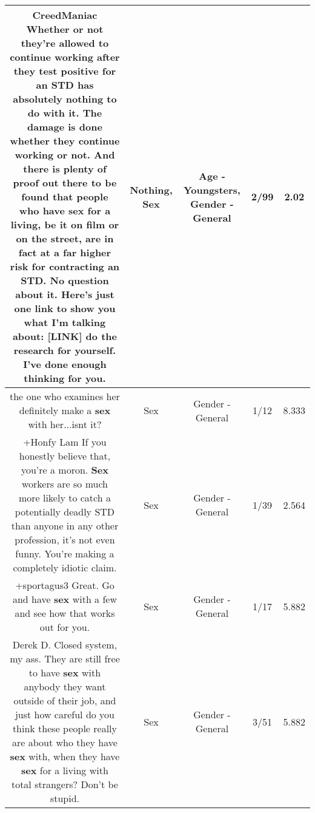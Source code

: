 \documentclass[11pt]{article}
\newlength\mylength
\begin{document}
\begin{center}
\begin{longtable}{|C{.65\mylength}|C{.30\mylength}|C{.12\mylength}|C{.12\mylength}|C{.12\mylength}|}
  \small CreedManiac Whether or not they're allowed to continue working after they test positive for an STD has absolutely \textbf{nothing} to do with it. The damage is done whether they continue working or not. And there is plenty of proof out there to be found that people who have \textbf{sex} for a living, be it on film or on the street, are in fact at a far higher risk for contracting an STD. No question about it. Here's just one link to show you what I'm talking about:  [LINK]  do the research for yourself. I've done enough thinking for you.\normalsize   & Nothing, Sex & Age - Youngsters, Gender - General & 2/99 & 2.02 \\  \hline
  \small the one who examines her definitely make a \textbf{sex} with her...isnt it?\normalsize   & Sex & Gender - General & 1/12 & 8.333 \\  \hline
  \small +Honfy Lam If you honestly believe that, you're a moron. \textbf{Sex} workers are so much more likely to catch a potentially deadly STD than anyone in any other profession, it's not even funny. You're making a completely idiotic claim.\normalsize   & Sex & Gender - General & 1/39 & 2.564 \\  \hline
  \small +sportagus3 Great. Go and have \textbf{sex} with a few and see how that works out for you.\normalsize   & Sex & Gender - General & 1/17 & 5.882 \\  \hline
  \small Derek D. Closed system, my ass. They are still free to have \textbf{sex} with anybody they want outside of their job, and just how careful do you think these people really are about who they have \textbf{sex} with, when they have \textbf{sex} for a living with total strangers? Don't be stupid.\normalsize   & Sex & Gender - General & 3/51 & 5.882 \\  \hline

\end{longtable}
\end{center}
\end{document}

